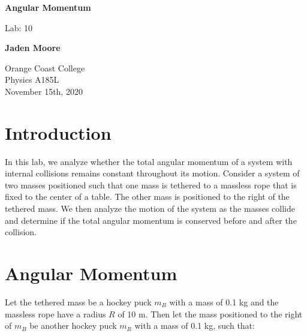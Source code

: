 \documentclass[12pt]{article}
\begin{document}

\begin{titlepage}
    \begin{center}
        \vspace*{1cm}
        \textbf{Angular Momentum}

        \vspace{0.5cm}
        Lab: 10

        \vspace{1cm}

        \textbf{Jaden Moore}

        \vfill

        Orange Coast College\\
        Physics A185L\\
        November 15th, 2020

    \end{center}
\end{titlepage}

\pagestyle{fancy}
\fancyhf{}
\setlength{\headheight}{15pt}
\cfoot{\thepage}

\section{Introduction}
In this lab, we analyze whether the total angular momentum of a system with internal collisions remains constant throughout its motion. Consider a system of two masses positioned such that one mass is tethered to a massless rope that is fixed to the center of a table. The other mass is positioned to the right of the tethered mass. We then analyze the motion of the system as the masses collide and determine if the total angular momentum is conserved before and after the collision.

\section{Angular Momentum}
Let the tethered mass be a hockey puck $m_B$ with a mass of 0.1 kg and the massless rope have a radius $R$ of 10 m. Then let the mass positioned to the right of $m_B$ be another hockey puck $m_R$ with a mass of 0.1 kg, such that:
\end{document}
